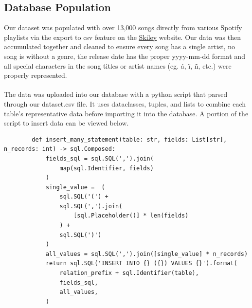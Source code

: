 \documentclass[12pt]{article}
\begin{document}
    \subsection{Database Population}
    Our dataset was populated with over 13,000 songs directly from various Spotify playlists
    via the export to csv feature on the \underline{\href{https://skiley.net/}{Skiley}} website.
    Our data was then accumulated together and cleaned to ensure every song has a single artist, no song
    is without a genre, the release date has the proper yyyy-mm-dd format and all special characters
    in the song titles or artist names (eg. \'{a}, \"{i}, \~{n}, etc.) were properly represented.
    \\~\\
    The data was uploaded into our database with a python script that parsed through our dataset.csv
    file. It uses dataclasses, tuples, and lists to combine each table's representative
    data before importing it into the database. A portion of the script to insert data can be viewed below.
    \begin{lstlisting}
        def insert_many_statement(table: str, fields: List[str], n_records: int) -> sql.Composed:
            fields_sql = sql.SQL(',').join(
                map(sql.Identifier, fields)
            )
            single_value =  (
                sql.SQL('(') +
                sql.SQL(',').join(
                    [sql.Placeholder()] * len(fields)
                ) +
                sql.SQL(')')
            )
            all_values = sql.SQL(',').join([single_value] * n_records)
            return sql.SQL('INSERT INTO {} ({}) VALUES {}').format(
                relation_prefix + sql.Identifier(table),
                fields_sql,
                all_values,
            )
    \end{lstlisting}
\end{document}
